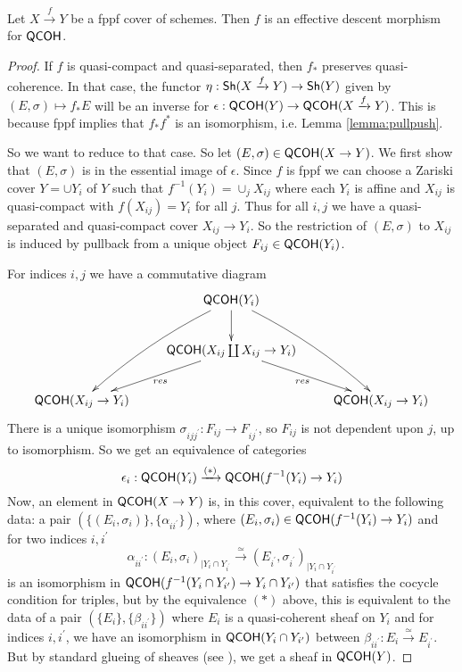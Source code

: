 \documentclass[11pt, english]{article}
\begin{document}
\begin{thm}
\label{desc_qcoh}
Let $X \xrightarrow{f} Y$ be a fppf cover of schemes. Then $f$ is an effective descent morphism for $\mathsf{QCOH}$. 
\end{thm}
\begin{proof}
If $f$ is quasi-compact and quasi-separated, then $f_\ast$ preserves quasi-coherence. In that case, the functor $\eta:\mathsf{Sh}(X \xrightarrow{f} Y) \to \mathsf{Sh}(Y)$ given by $(E, \sigma) \mapsto f_\ast E$ will be an inverse for $\epsilon:\mathsf{QCOH}(Y) \to \mathsf{QCOH}(X \xrightarrow{f} Y)$. This is because fppf implies that $f_\ast f^\ast $ is an isomorphism, i.e. Lemma \ref{lemma:pullpush}.

So we want to reduce to that case. So let $(E,\sigma) \in \mathsf{QCOH}(X \to Y)$. We first show that $(E,\sigma)$ is in the essential image of $\epsilon$. Since $f$ is fppf we can choose a Zariski cover $Y = \cup Y_i$ of $Y$ such that $f^{-1}(Y_i) = \cup_j X_{ij}$ where each $Y_i$ is affine and $X_{ij}$ is quasi-compact with $f(X_{ij})=Y_i$ for all $j$. Thus for all $i,j$ we have a quasi-separated and quasi-compact cover $X_{ij} \to Y_i$. So the restriction of $(E,\sigma)$ to $X_{ij}$ is induced by pullback from a unique object $F_{ij} \in \mathsf{QCOH}(Y_i)$.

For indices $i,j$ we have a commutative diagram
\[
\xymatrix{
 & \QCOH(Y_i) \ar@/^/[ddr] \ar@/_/[ldd]\ar[d] \\
 & \QCOH(X_{ij} \coprod X_{ij} \to Y_i) \ar[dr]_{res} \ar[dl]^{res} \\
\QCOH(X_{ij}  \to Y_i)  & & \QCOH(X_{ij} \to Y_i)
}
\]
There is a unique isomorphism $\sigma_{ijj^\prime}:F_{ij} \to F_{ij^\prime}$, so $F_{ij}$ is not dependent upon $j$, up to isomorphism. So we get an equivalence of categories
\[
\epsilon_i: \mathsf{QCOH}(Y_i) \xrightarrow{(\ast)} \mathsf{QCOH}(f^{-1}(Y_i) \to Y_i)
\]
Now, an element in $\mathsf{QCOH}(X \to Y)$ is, in this cover, equivalent to the following data: a pair $(\{(E_i,\sigma_i)\}, \{\alpha_{ii^\prime}\})$, where $(E_i, \sigma_i) \in \mathsf{QCOH}(f^{-1}(Y_i) \to Y_i)$ and for two indices $i,i^\prime$  \[\alpha_{ii^\prime}:(E_i, \sigma_i)_{|Y_i \cap Y_{i^\prime}} \xrightarrow{\simeq} (E_{i^\prime}, \sigma_{i^\prime})_{|Y_i \cap Y_{i^\prime}}\]
is an isomorphism in $\mathsf{QCOH}(f^{-1}(Y_i \cap Y_{i^\prime}) \to Y_i \cap Y_{i^\prime})$ that satisfies the cocycle condition for triples, but by the equivalence $(\ast)$ above, this is equivalent to the data of a pair $(\{E_i\}, \{\beta_{ii^\prime} \})$ where $E_i$ is a quasi-coherent sheaf on $Y_i$ and for indices $i,i^\prime$, we have an isomorphism in $\mathsf{QCOH}(Y_i \cap Y_{i^\prime})$ between $\beta_{ii^\prime}: E_i \xrightarrow{\simeq} E_{i^\prime}$. But by standard glueing of sheaves (see \cite{hartshorne}), we get a sheaf in $\mathsf{QCOH}(Y)$.
\end{proof}
\end{document}
